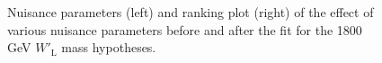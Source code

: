 \begin{figure}[H]
  \centering
  \caption{Nuisance parameters (left) and ranking plot (right) of the effect of various nuisance parameters before and after the fit for the 1800 GeV $W'_{\text{L}}$ mass hypotheses.}
  \label{fig:NuisParAndRanking_WpLH1800}
\end{figure}
